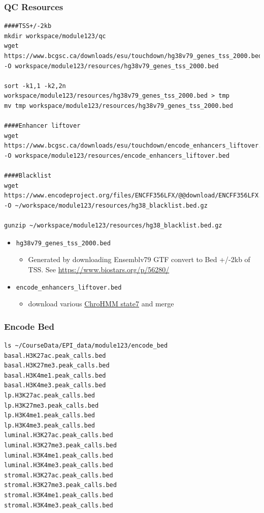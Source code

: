 \documentclass[
]{book}
\providecommand{\tightlist}{%
  \setlength{\itemsep}{0pt}\setlength{\parskip}{0pt}}
\begin{document}
\subsubsection{QC Resources}\label{qc-resources-1}

\begin{verbatim}
####TSS+/-2kb
mkdir workspace/module123/qc
wget https://www.bcgsc.ca/downloads/esu/touchdown/hg38v79_genes_tss_2000.bed -O workspace/module123/resources/hg38v79_genes_tss_2000.bed

sort -k1,1 -k2,2n workspace/module123/resources/hg38v79_genes_tss_2000.bed > tmp
mv tmp workspace/module123/resources/hg38v79_genes_tss_2000.bed

####Enhancer liftover
wget https://www.bcgsc.ca/downloads/esu/touchdown/encode_enhancers_liftover.bed -O workspace/module123/resources/encode_enhancers_liftover.bed

####Blacklist
wget https://www.encodeproject.org/files/ENCFF356LFX/@@download/ENCFF356LFX.bed.gz -O ~/workspace/module123/resources/hg38_blacklist.bed.gz

gunzip ~/workspace/module123/resources/hg38_blacklist.bed.gz
\end{verbatim}

\begin{itemize}
\tightlist
\item
  \texttt{hg38v79\_genes\_tss\_2000.bed}

  \begin{itemize}
  \tightlist
  \item
    Generated by downloading Ensemblv79 GTF convert to Bed +/-2kb of TSS. See \url{https://www.biostars.org/p/56280/}
  \end{itemize}
\item
  \texttt{encode\_enhancers\_liftover.bed}

  \begin{itemize}
  \tightlist
  \item
    download various \href{https://egg2.wustl.edu/roadmap/data/byFileType/chromhmmSegmentations/ChmmModels/coreMarks/jointModel/final/}{ChroHMM state7} and merge
  \end{itemize}
\end{itemize}

\subsubsection{Encode Bed}\label{encode-bed-1}

\begin{verbatim}
ls ~/CourseData/EPI_data/module123/encode_bed
basal.H3K27ac.peak_calls.bed
basal.H3K27me3.peak_calls.bed
basal.H3K4me1.peak_calls.bed
basal.H3K4me3.peak_calls.bed
lp.H3K27ac.peak_calls.bed
lp.H3K27me3.peak_calls.bed
lp.H3K4me1.peak_calls.bed
lp.H3K4me3.peak_calls.bed
luminal.H3K27ac.peak_calls.bed
luminal.H3K27me3.peak_calls.bed
luminal.H3K4me1.peak_calls.bed
luminal.H3K4me3.peak_calls.bed
stromal.H3K27ac.peak_calls.bed
stromal.H3K27me3.peak_calls.bed
stromal.H3K4me1.peak_calls.bed
stromal.H3K4me3.peak_calls.bed
\end{verbatim}
\end{document}
